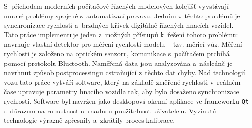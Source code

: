S~příchodem moderních počítačově řízených modelových kolejišť vyvstávají mnohé
problémy spojené s~automatizací provozu. Jedním z~těchto problémů je
synchronizace rychlostí a~brzdných křivek digitálně řízených hnacích vozidel.
Tato práce implementuje jeden z~možných přístupů k~řešení tohoto problému:
navrhuje vlastní detektor pro měření rychlosti modelu -- tzv. měricí vůz.
Měření rychlosti je založeno na optickém senzoru, komunikace s~počítačem
probíhá pomocí protokolu Bluetooth. Naměřená data jsou analyzována a~následně
je navrhnut způsob postprocessingu ostraňující z~těchto dat chyby.
Nad technologií vozu tato práce vytváří software, který na základě změřené
rychlosti v~reálném čase upravuje parametry hnacího vozidla tak, aby bylo
dosaženo synchronizace rychlosti. Software byl navržen jako desktopová okenní
aplikace ve frameworku \texttt{Qt} s~důrazem na robustnost a~snadnou
použitelnost uživatelem. Vyvinuté technologie výrazně zpřesnily a~zkrátily
proces kalibrace.
